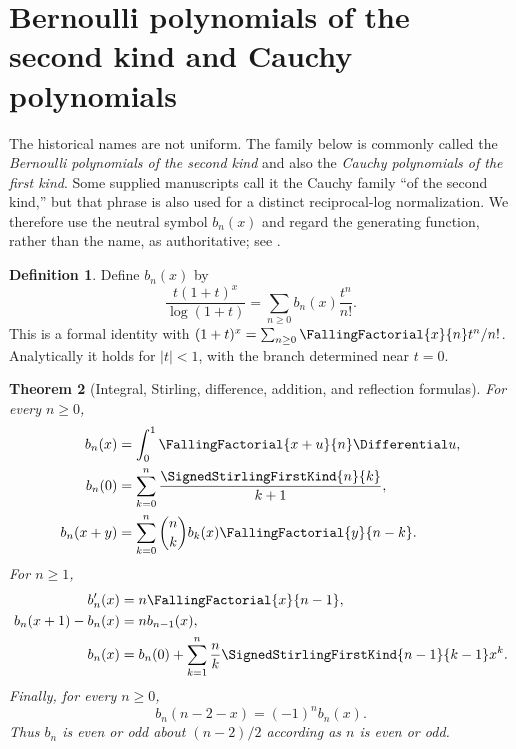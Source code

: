 \documentclass[11pt,a4paper,oneside,openany]{book}
\newtheorem{theorem}{Theorem}[chapter]
\theoremstyle{definition}
\newtheorem{definition}[theorem]{Definition}
\theoremstyle{remark}
\begin{document}
\section{Bernoulli polynomials of the second kind and Cauchy polynomials}
\label{sec:merged-cauchy-polynomials}

The historical names are not uniform.  The family below is commonly called
the \emph{Bernoulli polynomials of the second kind} and also the
\emph{Cauchy polynomials of the first kind}.  Some supplied manuscripts call
it the Cauchy family ``of the second kind,'' but that phrase is also used for
a distinct reciprocal-log normalization.  We therefore use the neutral
symbol $b_n(x)$ and regard the generating function, rather than the name, as
authoritative; see \cite{Norlund1924}.

\begin{definition}
\label{def:merged-cauchy-polynomials}
Define $b_n(x)$ by
\begin{equation}
 \frac{t(1+t)^x}{\log(1+t)}
 =\sum_{n\geq0}b_n(x)\frac{t^n}{n!}.                               \label{eq:merged-bernoulli-second-egf}
\end{equation}
This is a formal identity with
$(1+t)^x=\sum_{n\geq0}\FallingFactorial{x}{n}t^n/n!$.  Analytically it
holds for $|t|<1$, with the branch determined near $t=0$.
\end{definition}

\begin{theorem}[Integral, Stirling, difference, addition, and reflection formulas]
\label{thm:merged-cauchy-polynomials}
For every $n\geq0$,
\begin{align}
 b_n(x)&=\int_0^1\FallingFactorial{x+u}{n}\Differential u,          \label{eq:merged-cauchy-integral}\\
 b_n(0)&=\sum_{k=0}^{n}\frac{\SignedStirlingFirstKind{n}{k}}{k+1}, \label{eq:merged-cauchy-stirling-numbers}\\
 b_n(x+y)&=\sum_{k=0}^{n}\binom nk
 b_k(x)\FallingFactorial{y}{n-k}.                                 \label{eq:merged-cauchy-addition}
\end{align}
For $n\geq1$,
\begin{align}
 b_n'(x)&=n\FallingFactorial{x}{n-1},                              \label{eq:merged-cauchy-derivative}\\
 b_n(x+1)-b_n(x)&=n b_{n-1}(x),                                   \label{eq:merged-cauchy-difference}\\
 b_n(x)&=b_n(0)+\sum_{k=1}^{n}\frac nk
 \SignedStirlingFirstKind{n-1}{k-1}x^k.                           \label{eq:merged-cauchy-explicit}
\end{align}
Finally, for every $n\geq0$,
\begin{equation}
 \boxed{\displaystyle b_n(n-2-x)=(-1)^n b_n(x).}                  \label{eq:merged-cauchy-reflection}
\end{equation}
Thus $b_n$ is even or odd about $(n-2)/2$ according as $n$ is even or odd.
\end{theorem}
\end{document}
